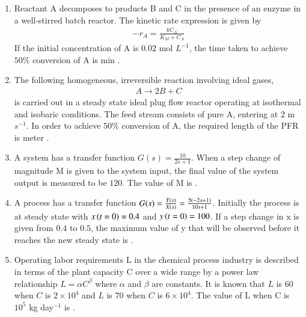 \documentclass[journal,12pt,onecolumn]{IEEEtran}
\theoremstyle{remark}
\begin{document}
\begin{enumerate}
 

\item Reactant A decomposes to products B and C in the presence of an enzyme in a well-stirred batch reactor. The kinetic rate expression is given by
\begin{align*}
-r_{A} = \frac{kC_{A}}{K_{M}+C_{A}}
\end{align*}
If the initial concentration of A is $0.02$ mol $L^{-1}$, the time taken to achieve $50\%$ conversion of A is \underline{\hspace{2cm}} min .
\hfill{}

 

\item The following homogeneous, irreversible reaction involving ideal gases,
\begin{align*}
A \rightarrow 2B + C
\end{align*}
is carried out in a steady state ideal plug flow reactor  operating at isothermal and isobaric conditions. The feed stream consists of pure A, entering at $2$ m $s^{-1}$. In order to achieve $50\%$ conversion of A, the required length of the PFR is \underline{\hspace{2cm}} meter .
\hfill{}

 

\item A system has a transfer function $G(s) = \frac{10}{2s+1}$. When a step change of magnitude M is given to the system input, the final value of the system output is measured to be $120$. The value of M is \underline{\hspace{2cm}}.
\hfill{}

 

\item A process has a transfer function $G(s) = \frac{Y(s)}{X(s)} = \frac{5\left(-2s+1\right)}{10s+1}$. Initially the process is at steady state with $x \left(t=0\right)=0.4$ and $y \left(t=0\right)=100$. If a step change in x is given from $0.4$ to $0.5$, the maximum value of y that will be observed before it reaches the new steady state is \underline{\hspace{2cm}} .
\hfill{}

 

\item Operating labor requirements L in the chemical process industry is described in terms of the plant capacity C  over a wide range  by a power law relationship $L = \alpha C^\beta$ where $\alpha$ and $\beta$ are constants. It is known that $L$ is $60$ when $C$ is $2 \times 10^4$ and $L$ is $70$ when $C$ is $6 \times 10^4$. The value of L when C is $10^5$ kg day$^{-1}$ is \underline{\hspace{2cm}} .
\hfill{}


\end{enumerate}
\end{document}
